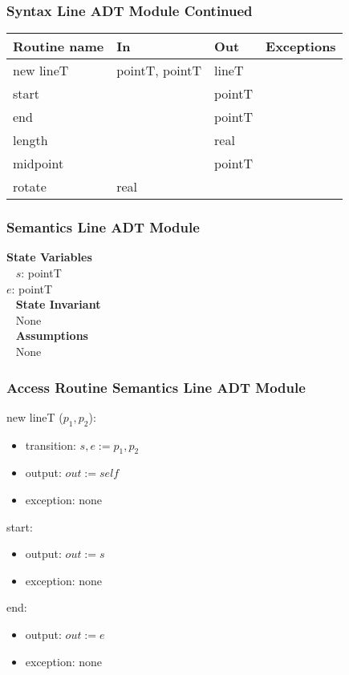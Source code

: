 \documentclass[t,12pt,numbers,fleqn,handout]{beamer}
\begin{document}
\begin{frame}
\frametitle{Syntax Line ADT Module Continued}

\begin{tabular}{| l | l | l | l |}
\hline
\textbf{Routine name} & \textbf{In} & \textbf{Out} & \textbf{Exceptions}\\
\hline
new lineT & pointT, pointT & lineT & ~\\
\hline
start & ~ & pointT & ~\\
\hline
end & ~ & pointT & ~\\
\hline 
length & ~ & real & ~\\
\hline
midpoint & ~ & pointT & ~\\
\hline
rotate & real & ~ & ~\\
\hline
\end{tabular}

\end{frame}


\begin{frame}
\frametitle{Semantics Line ADT Module}

\textbf{State Variables}\\
~\newline
$s$: pointT\\
$e$: pointT\\
~\newline
\textbf {State Invariant}\\
~\newline
None\\
~\newline
\textbf{Assumptions}\\
~\newline
None

\end{frame}


\begin{frame}
\frametitle{Access Routine Semantics Line ADT Module}

\noindent new lineT ($p_1, p_2$):
\begin{itemize}
\item transition: $s, e := p_1, p_2$
\item output: $out := \mathit{self}$
\item exception: none
\end{itemize}

\noindent start:
\begin{itemize}
\item output: $out := s$
\item exception: none
\end{itemize}

\noindent end:
\begin{itemize}
\item output: $out := e$
\item exception: none
\end{itemize}

\end{frame}
\end{document}
